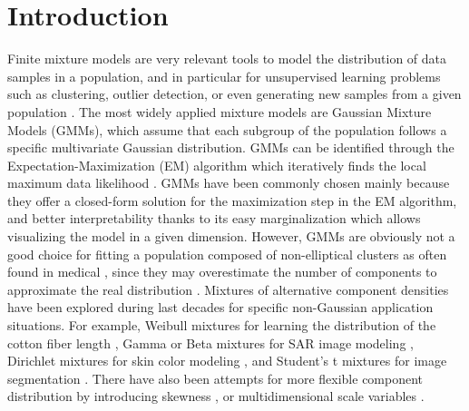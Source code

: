 \section{Introduction}
\label{sec:Introduction}

Finite mixture models are very relevant tools to model the distribution of data samples in a population, and in particular for unsupervised learning problems such as clustering, outlier detection, or even generating new samples from a given population \cite{mclachlan2019finite}. %
The most widely applied mixture models are Gaussian Mixture Models (GMMs), which
assume that each subgroup of the population follows a specific multivariate Gaussian distribution. GMMs can be identified through the Expectation-Maximization (EM) algorithm which iteratively finds the local maximum data likelihood \cite{mclachlan2007algorithm}.
GMMs have been commonly chosen mainly because they offer a closed-form solution for the maximization step in the EM algorithm, and better interpretability thanks to its easy marginalization which allows visualizing the model in a given dimension. 
However, GMMs are obviously not a good choice for fitting a population composed of non-elliptical clusters as often found in medical , since they may overestimate the number of components to approximate the real distribution . 
Mixtures of alternative component densities have been explored during last decades for specific non-Gaussian application situations. For example, Weibull mixtures for learning the distribution of the cotton fiber length \cite{kuang2015generating}, Gamma or Beta mixtures for SAR image modeling \cite{ma2011bayesian, liu2019bayesian}, Dirichlet mixtures for skin color modeling \cite{bouguila2004unsupervised}, and Student's t mixtures for image segmentation \cite{sfikas2007robust}. There have also been attempts for more flexible component distribution by introducing skewness \cite{lee2014finite}, %
or multidimensional scale variables \cite{forbes2014new}. %

